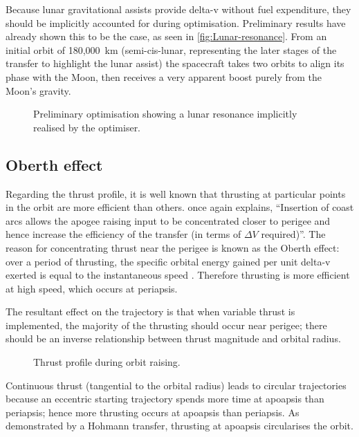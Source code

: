 Because lunar gravitational assists provide delta-v without fuel expenditure, they should be implicitly accounted for during optimisation. Preliminary results have already shown this to be the case, as seen in \autoref{fig:Lunar-resonance}. From an initial orbit of 180,000~km (semi-cis-lunar, representing the later stages of the transfer to highlight the lunar assist) the spacecraft takes two orbits to align its phase with the Moon, then receives a very apparent boost purely from the Moon's gravity.

\begin{figure}
\caption{Preliminary optimisation showing a lunar resonance implicitly realised by the optimiser.}
\label{fig:Lunar-resonance}
\centering
\end{figure}

\subsection{Oberth effect} \label{sub:Oberth}

Regarding the thrust profile, it is well known that thrusting at particular points in the orbit are more efficient than others. \textcite{Kemble2006} once again explains, \enquote{Insertion of coast arcs allows the apogee raising input to be concentrated closer to perigee and hence increase the efficiency of the transfer (in terms of $\Delta V$ required)}. The reason for concentrating thrust near the perigee is known as the Oberth effect: over a period of thrusting, the specific orbital energy gained per unit delta-v exerted is equal to the instantaneous speed \parencite{Oberth1923}. Therefore thrusting is more efficient at high speed, which occurs at periapsis.
 
The resultant effect on the trajectory is that when variable thrust is implemented, the majority of the thrusting should occur near perigee; there should be an inverse relationship between thrust magnitude and orbital radius. 

\begin{figure}
\caption{Thrust profile during orbit raising.}
\label{fig:Thrust_profile}
\centering
\end{figure}

Continuous thrust (tangential to the orbital radius) leads to circular trajectories because an eccentric starting trajectory spends more time at apoapsis than periapsis; hence more thrusting occurs at apoapsis than periapsis. As demonstrated by a Hohmann transfer, thrusting at apoapsis circularises the orbit.

